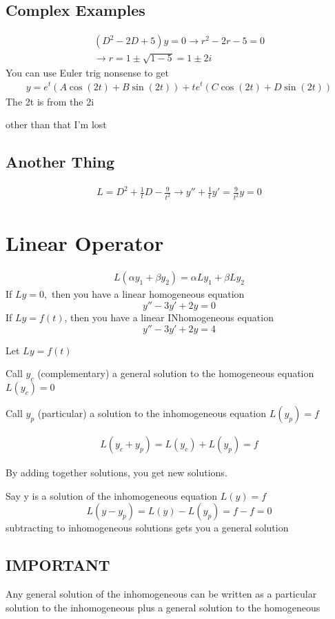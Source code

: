 \documentclass[fleqn]{report}
\newcommand{\equations} [1] {
\begin{gather*}
#1
\end{gather*}
}
\begin{document}
\subsection{Complex Examples}
\begin{gather*}
(D^2 - 2D + 5)y = 0
\rightarrow
r^2 - 2r - 5 = 0
\\
\rightarrow
r = 1 \pm \sqrt{1 - 5}
=
1 \pm 2i
\end{gather*}
You can use Euler trig nonsense to get
\begin{gather*}
y = e^t \left( A\cos (2t) + B \sin (2t) \right)
+
te^t \left( C \cos (2t) + D\sin (2t) \right)
\end{gather*}
The 2t is from the 2i

other than that I'm lost

\subsection{Another Thing}
\begin{gather*}
L = D^2 + \frac{1}{t} D - \frac{9}{t^2}
\rightarrow
y'' + \frac{1}{t} y' = \frac{9}{t^2} y = 0
\end{gather*}


\section{Linear Operator}
\begin{gather*}
L \left( \alpha y_1 + \beta y_2 \right)
=
\alpha L y_1 + \beta L y_2
\end{gather*}
If $Ly = 0,$ then you have a linear homogeneous equation
\[
y'' - 3y' + 2y = 0
\]
If $Ly = f(t)$, then you have a linear INhomogeneous equation
\[
y'' - 3y' + 2y = 4
\]

Let $Ly = f(t)$

Call $y_c$ (complementary) a general solution to the homogeneous equation $L(y_c) = 0$

Call $y_p$ (particular) a solution to the inhomogeneous equation $L(y_p) = f$
\equations{
L(y_c + y_p) = L(y_c) + L(y_p) = f
}
By adding together solutions, you get new solutions.

Say y is a solution of the inhomogeneous equation $L(y) = f$
\[
L(y - y_p) = L(y) - L(y_p) = f - f = 0
\]
subtracting to inhomogeneous solutions gets you a general solution

\subsection{IMPORTANT}
Any general solution of the inhomogeneous can be written as a particular solution to the inhomogeneous plus a general solution to the homogeneous
\end{document}
